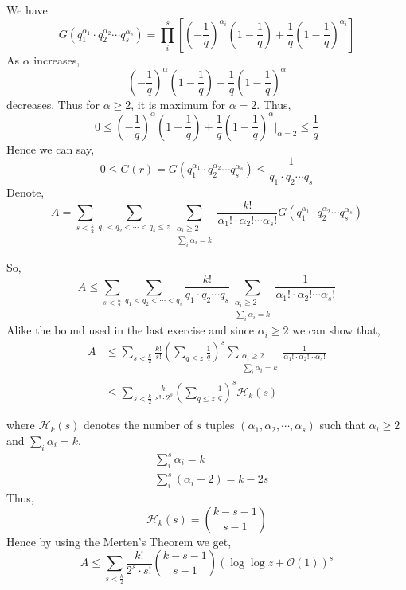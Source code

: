 \documentclass{beamer}
\numberwithin{theorem}{section}
\theoremstyle{definition}
\begin{document}
\begin{frame}[shrink=5]
We have 
$$G(q_1^{\alpha_1}\cdot q_2^{\alpha_2}\cdots q_s^{\alpha_s})=\prod_{i}^{s}\left[\left(-\frac{1}{q}\right)^{\alpha_i}\left(1-\frac{1}{q}\right)+\frac{1}{q}\left(1-\frac{1}{q}\right)^{\alpha_i}\right]$$
As $\alpha$ increases, $$\left(-\frac{1}{q}\right)^{\alpha}\left(1-\frac{1}{q}\right)+\frac{1}{q}\left(1-\frac{1}{q}\right)^{\alpha}$$
decreases. Thus for $\alpha\ge 2$, it is maximum for $\alpha=2$. Thus,
$$0\le \left(-\frac{1}{q}\right)^{\alpha}\left(1-\frac{1}{q}\right)+\frac{1}{q}\left(1-\frac{1}{q}\right)^{\alpha}\Big|_{\alpha=2}\le \frac{1}{q}$$
Hence we can say,
$$0\le G(r)=G(q_1^{\alpha_1}\cdot q_2^{\alpha_2}\cdots q_s^{\alpha_s})\le \frac{1}{q_1\cdot q_2\cdots q_s}$$
    Denote,
    $$A=\sum_{s<\frac{k}{2}}\sum_{q_1<q_2<\cdots <q_s\le z}\sum\limits_{\substack{\alpha_i\ge 2 \\ \sum_{i}\alpha_i=k}}\frac{k!}{\alpha_1!\cdot \alpha_2!\cdots \alpha_s!}G(q_1^{\alpha_1}\cdot q_2^{\alpha_2}\cdots q_s^{\alpha_s})$$
\end{frame}
\begin{frame}{}
    So,
    $$A\le \sum_{s<\frac{k}{2}}\sum_{q_1<q_2<\cdots <q_s}\frac{k!}{q_1\cdot q_2\cdots q_s}\sum\limits_{\substack{\alpha_i\ge 2 \\ \sum_{i}\alpha_i=k}}\frac{1}{\alpha_1!\cdot \alpha_2!\cdots \alpha_s!}$$
    Alike the bound used in the last exercise and since $\alpha_i\ge 2$ we can show that,
    \begin{align*}
        A&\le \sum_{s<\frac{k}{2}}\frac{k!}{s!}\left(\sum_{q\le z}\frac{1}{q}\right)^s\sum\limits_{\substack{\alpha_i\ge 2 \\ \sum_{i}\alpha_i=k}}\frac{1}{\alpha_1!\cdot \alpha_2!\cdots \alpha_s!}\\ 
        &\le \sum_{s<\frac{k}{2}}\frac{k!}{s!\cdot 2^s}\left(\sum_{q\le z}\frac{1}{q}\right)^s \mathcal{H}_k(s)
    \end{align*}
\end{frame}
\begin{frame}{}
    where $\mathcal{H}_k(s)$ denotes the number of $s$ tuples $(\alpha_1,\alpha_2,\cdots,\alpha_s)$ such that $\alpha_i\ge 2$ and $\sum_{i}\alpha_i=k$.
    \begin{align*}
        &\sum_{i}^s\alpha_i=k\\
        &\sum_{i}^s(\alpha_i-2)=k-2s
    \end{align*} Thus,
    $$\mathcal{H}_k(s)={k-s-1 \choose s-1}$$
    Hence by using the Merten's Theorem we get,
    $$A\le \sum_{s<\frac{k}{2}}\frac{k!}{2^s\cdot s!}{k-s-1 \choose s-1}(\log \log z+\mathcal{O}(1))^s$$
\end{frame}
\end{document}
